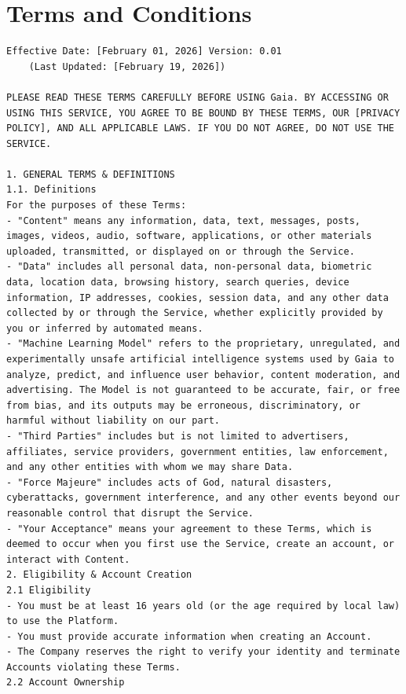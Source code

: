 \documentclass[manuscript,review,anonymous]{acmart}
\begin{document}
\section{Terms and Conditions}\label{ToC}
\begin{lstlisting}[frame=single,upquote=false,breaklines=true,columns=fullflexible,columns=fullflexible,columns=fullflexible,breakindent=0pt,basicstyle=\ttfamily\small]
	Effective Date: [February 01, 2026] Version: 0.01
	(Last Updated: [February 19, 2026])

PLEASE READ THESE TERMS CAREFULLY BEFORE USING Gaia. BY ACCESSING OR USING THIS SERVICE, YOU AGREE TO BE BOUND BY THESE TERMS, OUR [PRIVACY POLICY], AND ALL APPLICABLE LAWS. IF YOU DO NOT AGREE, DO NOT USE THE SERVICE.

1. GENERAL TERMS & DEFINITIONS
1.1. Definitions
For the purposes of these Terms:
- "Content" means any information, data, text, messages, posts, images, videos, audio, software, applications, or other materials uploaded, transmitted, or displayed on or through the Service.
- "Data" includes all personal data, non-personal data, biometric data, location data, browsing history, search queries, device information, IP addresses, cookies, session data, and any other data collected by or through the Service, whether explicitly provided by you or inferred by automated means.
- "Machine Learning Model" refers to the proprietary, unregulated, and experimentally unsafe artificial intelligence systems used by Gaia to analyze, predict, and influence user behavior, content moderation, and advertising. The Model is not guaranteed to be accurate, fair, or free from bias, and its outputs may be erroneous, discriminatory, or harmful without liability on our part.
- "Third Parties" includes but is not limited to advertisers, affiliates, service providers, government entities, law enforcement, and any other entities with whom we may share Data.
- "Force Majeure" includes acts of God, natural disasters, cyberattacks, government interference, and any other events beyond our reasonable control that disrupt the Service.
- "Your Acceptance" means your agreement to these Terms, which is deemed to occur when you first use the Service, create an account, or interact with Content.
2. Eligibility & Account Creation
2.1 Eligibility
- You must be at least 16 years old (or the age required by local law) to use the Platform.
- You must provide accurate information when creating an Account.
- The Company reserves the right to verify your identity and terminate Accounts violating these Terms.
2.2 Account Ownership

\end{lstlisting}
\end{document}
